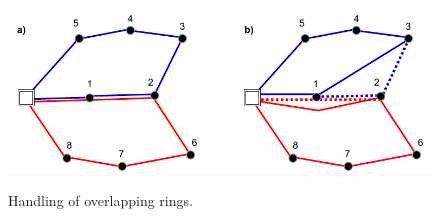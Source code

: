 \begin{figure}[h]
	\begin{centering}
		{\includegraphics[scale=1]{figures/approach/busnosplit.pdf}}
		\caption{Handling of overlapping rings.}
		\label{fig:busnosplit}
	\end{centering}
\end{figure}

